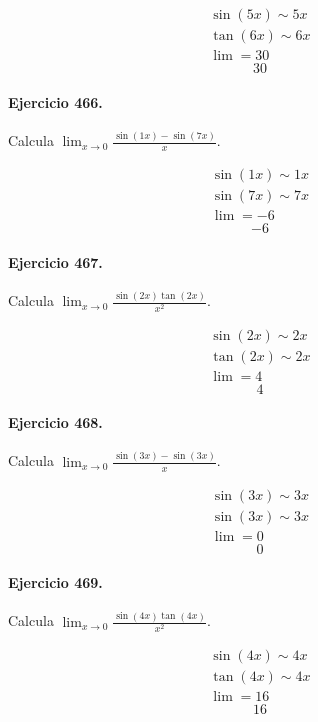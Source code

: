 \documentclass[11pt,a4paper]{article}
\begin{document}
\[
\begin{aligned}
\sin(5x)\sim 5x\\
\tan(6x)\sim 6x\\
\lim=30
\end{aligned}
\]
\[\boxed{30}\]


\paragraph{Ejercicio 466.} Calcula $\displaystyle\lim_{x\to0}\frac{\sin(1x)-\sin(7x)}{x}$.

\[
\begin{aligned}
\sin(1x)\sim 1x\\
\sin(7x)\sim 7x\\
\lim=-6
\end{aligned}
\]
\[\boxed{-6}\]


\paragraph{Ejercicio 467.} Calcula $\displaystyle\lim_{x\to0}\frac{\sin(2x)\tan(2x)}{x^2}$.

\[
\begin{aligned}
\sin(2x)\sim 2x\\
\tan(2x)\sim 2x\\
\lim=4
\end{aligned}
\]
\[\boxed{4}\]


\paragraph{Ejercicio 468.} Calcula $\displaystyle\lim_{x\to0}\frac{\sin(3x)-\sin(3x)}{x}$.

\[
\begin{aligned}
\sin(3x)\sim 3x\\
\sin(3x)\sim 3x\\
\lim=0
\end{aligned}
\]
\[\boxed{0}\]


\paragraph{Ejercicio 469.} Calcula $\displaystyle\lim_{x\to0}\frac{\sin(4x)\tan(4x)}{x^2}$.

\[
\begin{aligned}
\sin(4x)\sim 4x\\
\tan(4x)\sim 4x\\
\lim=16
\end{aligned}
\]
\[\boxed{16}\]
\end{document}
